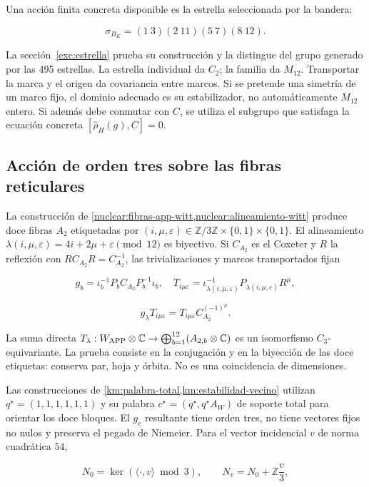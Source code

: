 Una acción finita concreta disponible es la estrella seleccionada por la bandera:

\[
\sigma_{B_K}=(1\ 3)(2\ 11)(5\ 7)(8\ 12).
\]

La sección~\ref{exc:estrella} prueba su construcción y la distingue del grupo generado por las 495 estrellas. La estrella individual da \(C_2\); la familia da \(M_{12}\). Transportar la marca y el origen da covariancia entre marcos. Si se pretende una simetría de un marco fijo, el dominio adecuado es su estabilizador, no automáticamente \(M_{12}\) entero. Si además debe conmutar con \(C\), se utiliza el subgrupo que satisfaga la ecuación concreta \([\widehat\rho_H(g),C]=0\).

\subsection{Acción de orden tres sobre las fibras reticulares}\label{nuc04:c3}

La construcción de \cref{nuclear:fibras-app-witt,nuclear:alineamiento-witt} produce doce fibras \(A_2\) etiquetadas por \((i,\mu,\varepsilon)\in\mathbb Z/3\mathbb Z\times\{0,1\}\times\{0,1\}\). El alineamiento \(\lambda(i,\mu,\varepsilon)=4i+2\mu+\varepsilon\pmod{12}\) es biyectivo. Si \(C_{A_2}\) es el Coxeter y \(R\) la reflexión con \(RC_{A_2}R=C_{A_2}^{-1}\), las trivializaciones y marcos transportados fijan

\[
g_b=\iota_b^{-1}P_bC_{A_2}P_b^{-1}\iota_b,
\quad T_{i\mu\varepsilon}=\iota_{\lambda(i,\mu,\varepsilon)}^{-1}P_{\lambda(i,\mu,\varepsilon)}R^\mu,
\]

\[
g_\lambda T_{i\mu\varepsilon}
=T_{i\mu\varepsilon}C_{A_2}^{(-1)^\mu}.
\]

La suma directa \(T_\lambda:W_{\rm APP}\otimes\mathbb C\to\bigoplus_{b=1}^{12}(A_{2,b}\otimes\mathbb C)\) es un isomorfismo \(C_3\)-equivariante. La prueba consiste en la conjugación y en la biyección de las doce etiquetas: conserva par, hoja y órbita. No es una coincidencia de dimensiones.

Las construcciones de \cref{km:palabra-total,km:estabilidad-vecino} utilizan \(q^\star=(1,1,1,1,1,1)\) y su palabra \(c^\star=(q^\star,q^\star A_W)\) de soporte total para orientar los doce bloques. El \(g_c\) resultante tiene orden tres, no tiene vectores fijos no nulos y preserva el pegado de Niemeier. Para el vector incidencial \(v\) de norma cuadrática \(54\),

\[
N_0=\ker(\langle\cdot,v\rangle\bmod3),\qquad
N_v=N_0+\mathbb Z\frac v3,
\]

